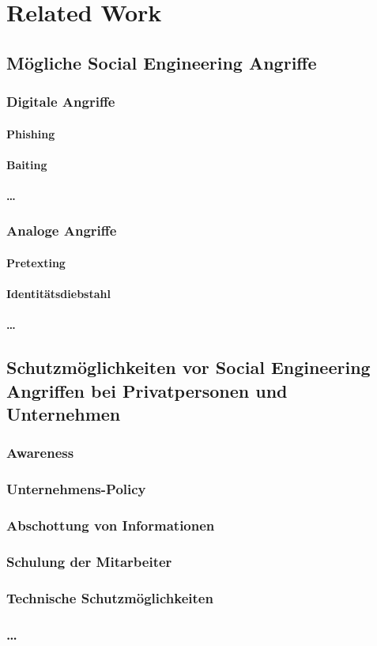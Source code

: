\chapter{Related Work}
\label{chapter:relatedwork}


\section{Mögliche Social Engineering Angriffe}
\subsection{\glqq{}Digitale\grqq{} Angriffe}
\subsubsection{Phishing}
\subsubsection{Baiting}
\subsubsection{\dots}
\subsection{\glqq{}Analoge\grqq{} Angriffe}
\subsubsection{Pretexting}
\subsubsection{Identitätsdiebstahl}
\subsubsection{\dots}
\section{Schutzmöglichkeiten vor Social Engineering Angriffen bei
Privatpersonen und Unternehmen}
\subsection{Awareness}
\subsection{Unternehmens-Policy}
\subsection{Abschottung von Informationen}
\subsection{Schulung der Mitarbeiter}
\subsection{Technische Schutzmöglichkeiten}
\subsection{\dots}
